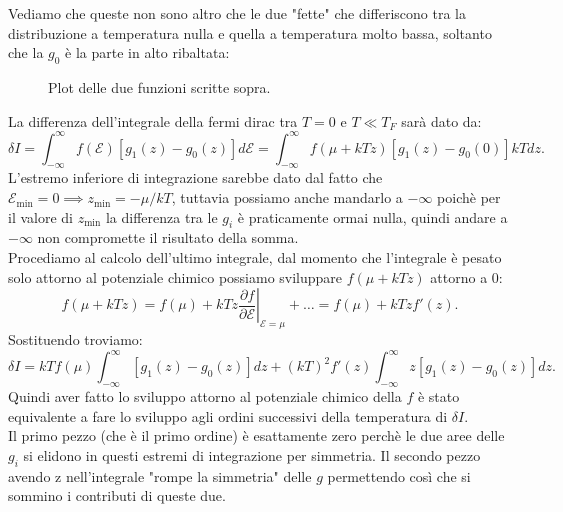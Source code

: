 Vediamo che queste non sono altro che le due "fette" che differiscono tra la distribuzione a temperatura nulla e quella a temperatura molto bassa, soltanto che la $g_0$ è la parte in alto ribaltata:
\begin{figure}[H]
    \centering
    \caption{\scriptsize Plot delle due funzioni scritte sopra.}
    \label{fig:g1-e-g0}
\end{figure}
La differenza dell'integrale della fermi dirac tra $T=0$ e  $T\ll T_{F}$ sarà dato da:
\[
	\delta I = \int_{-\infty}^{\infty} f( \mathcal{E} ) \left[ g_1( z) - g_0( z)  \right] d\mathcal{E}   = \int_{-\infty}^{\infty}  f ( \mu + kTz) 
	\left[ g_1( z) - g_0( 0)  \right] kT dz
.\] 
L'estremo inferiore di integrazione sarebbe dato dal fatto che $\mathcal{E} _{\text{min}}=0 \implies z_{\text{min}}= - \mu /kT$, tuttavia possiamo anche mandarlo a $-\infty$ poichè per il valore di $z_{\text{min}}$ la differenza tra le $g_{i}$ è praticamente ormai nulla, quindi andare a $-\infty$ non compromette il risultato della somma.\\
Procediamo al calcolo dell'ultimo integrale, dal momento che l'integrale è pesato solo attorno al potenziale chimico possiamo sviluppare $f( \mu + kTz) $ attorno a $0$:
\[
	f( \mu + kTz) = f( \mu )  + kTz \left.\frac{\partial f}{\partial \mathcal{E}  } \right|_{\mathcal{E} =\mu } + \ldots= f( \mu )+ kTzf'( z)  
.\] 
Sostituendo troviamo:
\[
	\delta I = kTf( \mu )  \int_{-\infty}^{\infty} \left[ g_1( z)- g_0( z)   \right] dz + ( kT) ^2f'( z) \int_{-\infty}^{\infty} z \left[ g_1( z) -g_0( z)  \right] dz  
.\] 
Quindi aver fatto lo sviluppo attorno al potenziale chimico della $f$ è stato equivalente a fare lo sviluppo agli ordini successivi della temperatura di $\delta I$.\\
Il primo pezzo (che è il primo ordine) è esattamente zero perchè le due aree delle $g_{i}$ si elidono in questi estremi di integrazione per simmetria. Il secondo pezzo avendo z nell'integrale "rompe la simmetria" delle $g$ permettendo così che si sommino i contributi di queste due.
